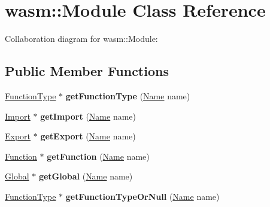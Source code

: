 \hypertarget{classwasm_1_1_module}{}\section{wasm\+:\+:Module Class Reference}
\label{classwasm_1_1_module}


Collaboration diagram for wasm\+:\+:Module\+:
\subsection*{Public Member Functions}
\begin{DoxyCompactItemize}
\item 
\mbox{\label{classwasm_1_1_module_ade8889ac6d7b6c34054f0d102e57c8b3}} 
\mbox{\hyperlink{classwasm_1_1_function_type}{Function\+Type}} $\ast$ {\bfseries get\+Function\+Type} (\mbox{\hyperlink{structwasm_1_1_name}{Name}} name)
\item 
\mbox{\label{classwasm_1_1_module_a8b46ff4eb68a85e75a8718bd61c55018}} 
\mbox{\hyperlink{classwasm_1_1_import}{Import}} $\ast$ {\bfseries get\+Import} (\mbox{\hyperlink{structwasm_1_1_name}{Name}} name)
\item 
\mbox{\label{classwasm_1_1_module_aa2b928dce52b8f5ccb682851625cbdaf}} 
\mbox{\hyperlink{classwasm_1_1_export}{Export}} $\ast$ {\bfseries get\+Export} (\mbox{\hyperlink{structwasm_1_1_name}{Name}} name)
\item 
\mbox{\label{classwasm_1_1_module_afcd991c2ff80444163025a5d4c124d7e}} 
\mbox{\hyperlink{classwasm_1_1_function}{Function}} $\ast$ {\bfseries get\+Function} (\mbox{\hyperlink{structwasm_1_1_name}{Name}} name)
\item 
\mbox{\label{classwasm_1_1_module_a1ab6df6a647b587261ec4d7582dd8644}} 
\mbox{\hyperlink{classwasm_1_1_global}{Global}} $\ast$ {\bfseries get\+Global} (\mbox{\hyperlink{structwasm_1_1_name}{Name}} name)
\item 
\mbox{\label{classwasm_1_1_module_a8d36b7d95d934480e265f845e2c42a2d}} 
\mbox{\hyperlink{classwasm_1_1_function_type}{Function\+Type}} $\ast$ {\bfseries get\+Function\+Type\+Or\+Null} (\mbox{\hyperlink{structwasm_1_1_name}{Name}} name)

\end{DoxyCompactItemize}

